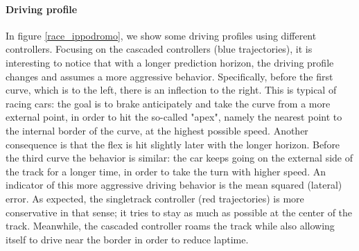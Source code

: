 \documentclass[a4paper, onecolumn, 12pt]{article}
\begin{document}
\paragraph{Driving profile}
In figure \ref{race_ippodromo}, we show some driving profiles using different
controllers. Focusing on the cascaded controllers (blue trajectories), it is
interesting to notice that with a longer prediction horizon, the driving profile
changes and assumes a more aggressive behavior. Specifically, before the first
curve, which is to the left, there is an inflection to the right. This is
typical of racing cars: the goal is to brake anticipately and take the curve
from a more external point, in order to hit the so-called "apex", namely the
nearest point to the internal border of the curve, at the highest possible
speed. Another consequence is that the flex is hit slightly later with the
longer horizon. Before the third curve the behavior is similar: the car keeps
going on the external side of the track for a longer time, in order to take the
turn with higher speed. An indicator of this more aggressive driving behavior is
the mean squared (lateral) error. As expected, the singletrack controller (red
trajectories) is more conservative in that sense; it tries to stay as much as
possible at the center of the track. Meanwhile, the cascaded controller roams
the track while also allowing itself to drive near the border in order to reduce
laptime.
\end{document}
